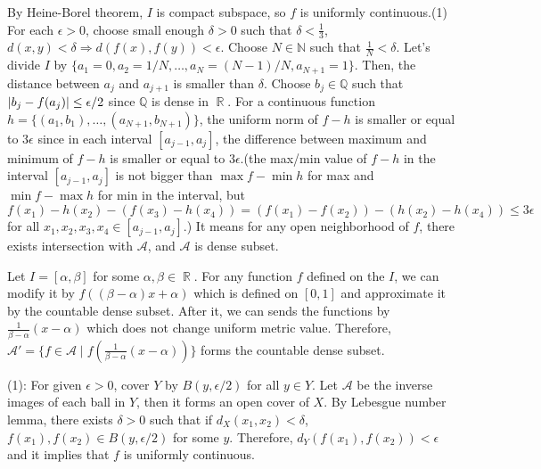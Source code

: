 \documentclass{article}
\DeclareMathOperator{\rr}{\mathbb{R}}
\begin{document}
By Heine-Borel theorem, $I$ is compact subspace, so $f$ is uniformly continuous.(1) For each $\epsilon>0$, choose small enough $\delta>0$ such that $\delta<\frac{1}{3}$, $d(x,y)<\delta\Rightarrow d(f(x),f(y))<\epsilon$. Choose $N\in \mathbb{N}$ such that $\frac{1}{N}<\delta$. Let's divide $I$ by $\{a_1=0, a_2=1/N, \ldots, a_{N}=(N-1)/N, a_{N+1}=1\}$. Then, the distance between $a_j$ and $a_{j+1}$ is smaller than $\delta$. Choose $b_j\in \mathbb{Q}$ such that $\abs{b_j-f(a_j)}\leq \epsilon/2$ since $\mathbb{Q}$ is dense in $\rr$. For a continuous function $h=\{(a_1, b_1), \ldots, (a_{N+1}, b_{N+1})\}$, the uniform norm of $f-h$ is smaller or equal to $3\epsilon$ since in each interval $[a_{j-1}, a_j]$, the difference between maximum and minimum of $f-h$ is smaller or equal to $3\epsilon$.(the max/min value of $f-h$ in the interval $[a_{j-1}, a_j]$ is not bigger than $\max f-\min h$ for max and $\min f-\max h$ for min in the interval, but $f(x_1)-h(x_2)-(f(x_3)-h(x_4))=(f(x_1)-f(x_2))-(h(x_2)-h(x_4))\leq 3\epsilon$ for all $x_1, x_2, x_3, x_4\in [a_{j-1}, a_j]$.) It means for any open neighborhood of $f$, there exists intersection with $\mathcal{A}$, and $\mathcal{A}$ is dense subset.

Let $I=[\alpha, \beta]$ for some $\alpha,\beta\in \rr$. For any function $f$ defined on the $I$, we can modify it by $f((\beta-\alpha)x+\alpha)$ which is defined on $[0,1]$ and approximate it by the countable dense subset. After it, we can sends the functions by $\frac{1}{\beta-\alpha}(x-\alpha)$ which does not change uniform metric value. Therefore, $\mathcal{A}'=\{f\in \mathcal{A}\mid f(\frac{1}{\beta-\alpha}(x-\alpha))\}$ forms the countable dense subset.

(1): For given $\epsilon>0$, cover $Y$ by $B(y, \epsilon/2)$ for all $y\in Y$. Let $\mathcal{A}$ be the inverse images of each ball in $Y$, then it forms an open cover of $X$. By Lebesgue number lemma, there exists $\delta>0$ such that if $d_X(x_1, x_2)<\delta$, $f(x_1), f(x_2)\in B(y, \epsilon/2)$ for some $y$. Therefore, $d_Y(f(x_1), f(x_2))<\epsilon$ and it implies that $f$ is uniformly continuous.
\end{document}
